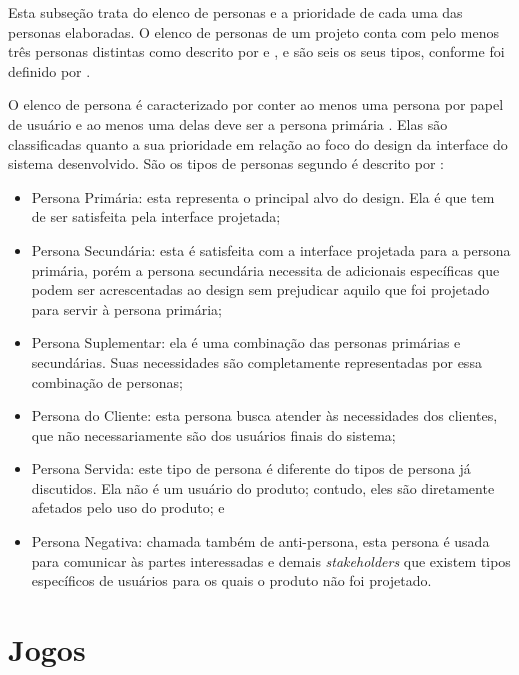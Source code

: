 Esta subseção trata do elenco de personas e a prioridade de cada uma das personas elaboradas. O elenco de personas de um projeto conta com pelo menos três personas distintas como descrito por  e \citeauthor{usability2020}, e são seis os seus tipos, conforme foi definido por .

O elenco de persona é caracterizado por conter ao menos uma persona por papel de usuário e ao menos uma delas deve ser a persona primária \cite{barbosa_silva}. Elas são classificadas quanto a sua prioridade em relação ao foco do design da interface do sistema desenvolvido. São os tipos de personas segundo é descrito por :

\begin{itemize}
    \item Persona Primária: esta representa o principal alvo do design. Ela é que tem de ser satisfeita pela interface projetada;
    
    \item Persona Secundária: esta é satisfeita com a interface projetada para a persona primária, porém a persona secundária necessita de adicionais específicas que podem ser acrescentadas ao design sem prejudicar aquilo que foi projetado para servir à persona primária;
    
    \item Persona Suplementar: ela é uma combinação das personas  primárias e secundárias. Suas necessidades são completamente representadas por essa combinação de personas;
    
    \item Persona do Cliente: esta persona busca atender às necessidades dos clientes, que não necessariamente são dos usuários finais do sistema;
    
    \item Persona Servida: este tipo de persona é diferente do tipos de persona já discutidos. Ela não é um usuário do produto; contudo, eles são diretamente afetados pelo uso do produto; e
    
    \item Persona Negativa: chamada também de anti-persona, esta persona é usada para comunicar às partes interessadas e demais \textit{stakeholders} que existem tipos específicos de usuários para os quais o produto não foi projetado. 
\end{itemize}

\section{Jogos}

